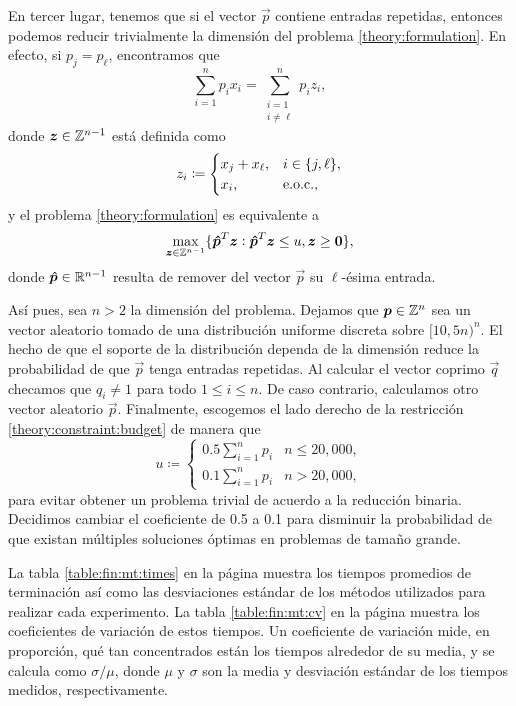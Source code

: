 En tercer lugar, tenemos que si el vector $\vec{p}$ contiene entradas repetidas, entonces podemos
reducir trivialmente la dimensión del problema \eqref{theory:formulation}. En efecto, si $p_j =
p_\ell$, encontramos que
\begin{equation*}
	\sum_{i = 1}^{n}p_ix_i = \sum_{\substack{i = 1 \\ i \neq \ell}}^{n}p_iz_i,
\end{equation*}
donde $\boldsymbol{z} \in \mathbb{Z}^{n-1}$ está definida como
\begin{equation*}
	z_i \coloneq \begin{cases}
		x_j + x_\ell, & i \in \lbrace j, \ell \rbrace, \\
		x_i, & \text{e.o.c.},
	\end{cases}
\end{equation*}
y el problema \eqref{theory:formulation} es equivalente a
\begin{equation*}
	\max_{\boldsymbol{z} \in \mathbb{Z}^{n-1}} \lbrace \boldsymbol{\hat{p}}^T\boldsymbol{z} \vcentcolon \boldsymbol{\hat{p}}^T\boldsymbol{z} \leq u,
	\boldsymbol{z} \geq \boldsymbol{0} \rbrace,
\end{equation*}
donde $\boldsymbol{\hat{p}} \in \mathbb{R}^{n-1}$ resulta de remover del vector $\vec{p}$ su $\ell$-ésima entrada.

Así pues, sea $n > 2$ la dimensión del problema. Dejamos que $\boldsymbol{p} \in \mathbb{Z}^n$ sea un vector aleatorio
tomado de una distribución uniforme discreta sobre $[10, 5n)^n$. El hecho de que el soporte de la
distribución dependa de la dimensión reduce la probabilidad de que $\vec{p}$ tenga entradas
repetidas. Al calcular el vector coprimo $\vec{q}$ checamos que $q_i \neq 1$ para todo $1 \leq i
\leq n$. De caso contrario, calculamos otro vector aleatorio $\vec{p}$. Finalmente, escogemos el
lado derecho de la restricción \eqref{theory:constraint:budget} de manera que
\begin{equation*}
	u \coloneq \begin{cases}
		0.5\sum_{i=1}^{n}p_i & n \leq 20{,}000, \\
		0.1\sum_{i=1}^{n}p_i & n > 20{,}000,
	\end{cases}
\end{equation*}
para evitar obtener un problema trivial de acuerdo a la reducción binaria. Decidimos cambiar el
coeficiente de 0.5 a 0.1 para disminuir la probabilidad de que existan múltiples soluciones óptimas
en problemas de tamaño grande.

La tabla \ref{table:fin:mt:times} en la página \pageref{table:fin:mt:times} muestra los tiempos
promedios de terminación así como las desviaciones estándar de los métodos utilizados para realizar
cada experimento. La tabla \ref{table:fin:mt:cv} en la página \pageref{table:fin:mt:cv} muestra los
coeficientes de variación de estos tiempos. Un coeficiente de variación mide, en proporción, qué tan
concentrados están los tiempos alrededor de su media, y se calcula como $\sigma / \mu$, donde $\mu$
y $\sigma$ son la media y desviación estándar de los tiempos medidos, respectivamente.

